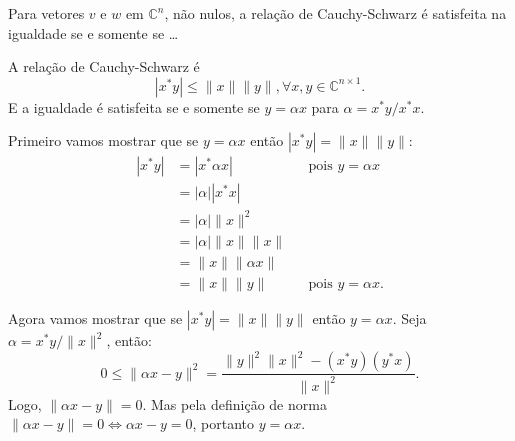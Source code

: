 \begin{questions}
     Para vetores $v$ e $w$ em $\mathbb{C}^n$, n\~{a}o nulos, a rela\c{c}\~{a}o de Cauchy-Schwarz \'{e} satisfeita na igualdade se e somente se \dots
    \begin{solution}
        A rela\c{c}\~{a}o de Cauchy-Schwarz \'{e}
        \[
        | x^* y | \leq \| x \| \| y \|, \forall x, y \in \mathbb{C}^{n \times 1}.
        \]
        E a igualdade \'{e} satisfeita se e somente se $y = \alpha x$ para $\alpha = x^* y / x^* x$.

        Primeiro vamos mostrar que se $y = \alpha x$ ent\~{a}o $| x^* y | = \| x \| \| y \|$:
        \begin{align*}
            | x^* y | &= | x^* \alpha x | && \text{pois $y = \alpha x$} \\
            &= | \alpha | | x^* x | \\
            &= | \alpha | \| x \|^2 \\
            &= | \alpha | \| x \| \| x \| \\
            &= \| x \| \| \alpha x \| \\
            &= \| x \| \| y \| && \text{pois $y = \alpha x$.}
        \end{align*}

        Agora vamos mostrar que se $| x^* y | = \| x \| \| y \|$ ent\~{a}o $y = \alpha x$. Seja $\alpha = x^* y / \| x \|^2$, ent\~{a}o:
        \[
        0 \leq \| \alpha x - y \|^2 = \frac{\| y \| ^2 \| x \|^2 - \left( x^* y \right) \left( y^* x \right)}{\| x \|^2}.
        \]
        Logo, $\| \alpha x - y \| = 0$. Mas pela defini\c{c}\~{a}o de norma $\| \alpha x - y \| = 0 \iff \alpha x - y = 0$, portanto $y = \alpha x$.
    \end{solution}


\end{questions}
